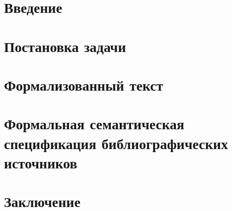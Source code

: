 \section*{Введение}


\newpage
\section{Постановка задачи}


\newpage
\section{Формализованный текст}


\newpage
\section{Формальная семантическая спецификация библиографических источников}


\newpage
\section*{Заключение}

